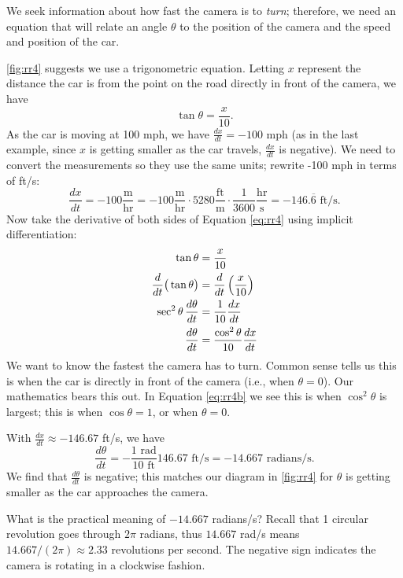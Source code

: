{We seek information about how fast the camera is to \textit{turn}; therefore, we need an equation that will relate an angle $\theta$ to the position of the camera and the speed and position of the car.

\autoref{fig:rr4} suggests we use a trigonometric equation. Letting $x$ represent the distance the car is from the point on the road directly in front of the camera, we have
\begin{equation}\tan \theta = \frac{x}{10}.\label{eq:rr4}\end{equation}
As the car is moving at 100 mph, we have $\frac{dx}{dt} = -100$ mph (as in the last example, since $x$ is getting smaller as the car travels, $\frac{dx}{dt}$ is negative). We need to convert the measurements so they use the same units; rewrite -100 mph in terms of ft/s:
\[
\frac{dx}{dt} = -100\frac{\text{m}}{\text{hr}} = -100\frac{\text{m}}{\text{hr}}\cdot5280\frac{\text{ft}}{\text{m}}\cdot\frac{1}{3600}\frac{\text{hr}}{\text{s}} =-146.\overline{6}\text{ ft/s}.
\]
Now take the derivative of both sides of Equation \eqref{eq:rr4} using implicit differentiation:
\begin{align}
	\tan \theta &= \frac{x}{10} \notag \\
	\frac{d}{dt}\big(\tan \theta\big)
	&= \frac{d}{dt}\left(\frac{x}{10}\right)\notag \\
	\sec^2\theta\,\frac{d\theta}{dt} &= \frac{1}{10}\frac{dx}{dt}\notag\\
	\frac{d\theta}{dt} &= \frac{\cos^2\theta}{10}\frac{dx}{dt}\label{eq:rr4b}
\end{align}
We want to know the fastest the camera has to turn. Common sense tells us this is when the car is directly in front of the camera (i.e., when $\theta = 0$). Our mathematics bears this out. In Equation \eqref{eq:rr4b} we see this is when $\cos^2\theta$ is largest; this is when $\cos \theta = 1$, or when $\theta = 0$.

With $\frac{dx}{dt} \approx -146.67$ ft/s, we have
\[
 \frac{d\theta}{dt}
 = -\frac{1\text{ rad}}{10\text{ ft}}146.67\text{ ft/s}
 = -14.667\text{ radians/s}.
\]
We find that $\frac{d\theta}{dt}$ is negative; this matches our diagram in \autoref{fig:rr4} for $\theta$ is getting smaller as the car approaches the camera.	
	
What is the practical meaning of $-14.667$ radians/s? Recall that 1 circular revolution goes through $2\pi$ radians, thus $14.667$ rad/s means $14.667/(2\pi)\approx 2.33$ revolutions per second. The negative sign indicates the camera is rotating in a clockwise fashion.}

